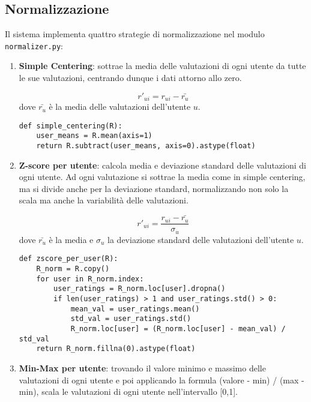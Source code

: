\subsection{Normalizzazione}

Il sistema implementa quattro strategie di normalizzazione nel modulo \texttt{normalizer.py}:

\begin{enumerate}
    \item \textbf{Simple Centering}: sottrae la media delle valutazioni di ogni utente da tutte le sue valutazioni, centrando dunque i dati attorno allo zero.

    \[
    r'_{ui} = r_{ui} - \bar{r_u}
    \]
    dove $\bar{r_u}$ è la media delle valutazioni dell’utente $u$.

    \begin{lstlisting}[style=PythonStyle, caption=Normalizzazione: Simple Centering]
def simple_centering(R):
    user_means = R.mean(axis=1)
    return R.subtract(user_means, axis=0).astype(float)
    \end{lstlisting}
    
    \item \textbf{Z-score per utente}: calcola media e deviazione standard delle valutazioni di ogni utente. Ad ogni valutazione si sottrae la media come in simple centering, ma si divide anche per la deviazione standard, normalizzando non solo la scala ma anche la variabilità delle valutazioni.

    \[
    r'_{ui} = \frac{r_{ui} - \bar{r_u}}{\sigma_u}
    \]
    dove $\bar{r_u}$ è la media e $\sigma_u$ la deviazione standard delle valutazioni dell’utente $u$.

    \begin{lstlisting}[style=PythonStyle, caption=Normalizzazione: Z-Score]
def zscore_per_user(R):
    R_norm = R.copy()
    for user in R_norm.index:
        user_ratings = R_norm.loc[user].dropna()
        if len(user_ratings) > 1 and user_ratings.std() > 0:
            mean_val = user_ratings.mean()
            std_val = user_ratings.std()
            R_norm.loc[user] = (R_norm.loc[user] - mean_val) / std_val
    return R_norm.fillna(0).astype(float)
    \end{lstlisting}
    
    \item \textbf{Min-Max per utente}: trovando il valore minimo e massimo delle valutazioni di ogni utente e poi applicando la formula (valore - min) / (max - min), scala le valutazioni di ogni utente nell'intervallo [0,1].


\end{enumerate}
